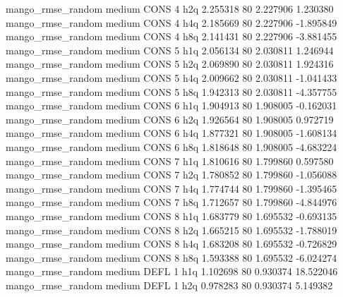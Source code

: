 mango_rmse_random     medium     CONS                 4                  h2q  2.255318 80       2.227906           1.230380
mango_rmse_random     medium     CONS                 4                  h4q  2.185669 80       2.227906          -1.895849
mango_rmse_random     medium     CONS                 4                  h8q  2.141431 80       2.227906          -3.881455
mango_rmse_random     medium     CONS                 5                  h1q  2.056134 80       2.030811           1.246944
mango_rmse_random     medium     CONS                 5                  h2q  2.069890 80       2.030811           1.924316
mango_rmse_random     medium     CONS                 5                  h4q  2.009662 80       2.030811          -1.041433
mango_rmse_random     medium     CONS                 5                  h8q  1.942313 80       2.030811          -4.357755
mango_rmse_random     medium     CONS                 6                  h1q  1.904913 80       1.908005          -0.162031
mango_rmse_random     medium     CONS                 6                  h2q  1.926564 80       1.908005           0.972719
mango_rmse_random     medium     CONS                 6                  h4q  1.877321 80       1.908005          -1.608134
mango_rmse_random     medium     CONS                 6                  h8q  1.818648 80       1.908005          -4.683224
mango_rmse_random     medium     CONS                 7                  h1q  1.810616 80       1.799860           0.597580
mango_rmse_random     medium     CONS                 7                  h2q  1.780852 80       1.799860          -1.056088
mango_rmse_random     medium     CONS                 7                  h4q  1.774744 80       1.799860          -1.395465
mango_rmse_random     medium     CONS                 7                  h8q  1.712657 80       1.799860          -4.844976
mango_rmse_random     medium     CONS                 8                  h1q  1.683779 80       1.695532          -0.693135
mango_rmse_random     medium     CONS                 8                  h2q  1.665215 80       1.695532          -1.788019
mango_rmse_random     medium     CONS                 8                  h4q  1.683208 80       1.695532          -0.726829
mango_rmse_random     medium     CONS                 8                  h8q  1.593388 80       1.695532          -6.024274
mango_rmse_random     medium     DEFL                 1                  h1q  1.102698 80       0.930374          18.522046
mango_rmse_random     medium     DEFL                 1                  h2q  0.978283 80       0.930374           5.149382
